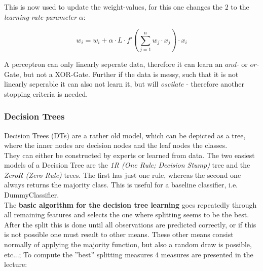 \documentclass[12pt,a4paper]{article}
\begin{document}
\noindent This is now used to update the weight-values, for this one changes the \(2\) to the \textit{learning-rate-parameter} \(\alpha\):

\[w_i = w_i + \alpha \cdot L \cdot f'(\sum_{j = 1}^n w_j \cdot x_j) \cdot x_i\]

\noindent A perceptron can only linearly seperate data, therefore it can learn an \(and\)- or \(or\)-Gate, but not a XOR-Gate. Further if the data is messy, such that it is not linearly seperable it can also not learn it, but will \textit{oscilate} - therefore another stopping criteria is needed.

\subsubsection{Decision Trees}
\label{subsubsection:dt}


\noindent Decision Trees (DTs) are a rather old model, which can be depicted as a tree, where the inner nodes are decision nodes and the leaf nodes the classes.\\
They can either be constructed by experts or learned from data. The two easiest models of a Decision Tree are the \textit{1R (One Rule; Decision Stump)} tree and the \textit{ZeroR (Zero Rule)} trees. The first has just one rule, whereas the second one always returns the majority class. This is useful for a baseline classifier, i.e. DummyClassifier.\\
The \textbf{basic algorithm for the decision tree learning} goes repeatedly through all remaining features and selects the one where splitting seems to be the best. After the split this is done until all observations are predicted correctly, or if this is not possible one must result to other means. These other means consist normally of applying the majority function, but also a random draw is possible, etc...; To compute the ''best'' splitting measures 4 measures are presented in the lecture:
\end{document}
